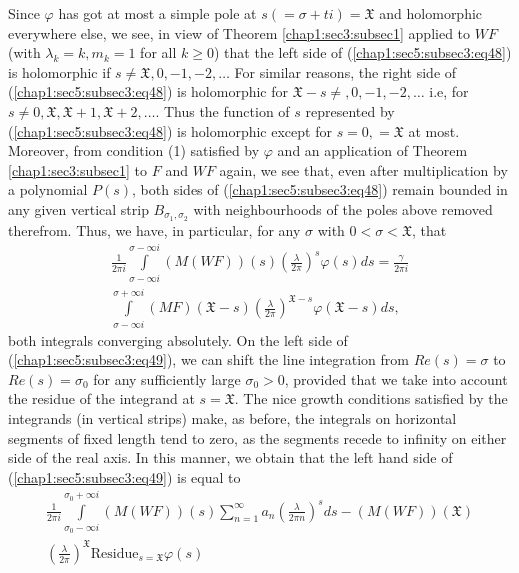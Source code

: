   Since $\varphi$ has got at most a simple pole at
  $s(=\sigma+ti)=\mathfrak{X}$ and holomorphic everywhere else, we see,
  in view of Theorem \ref{chap1:sec3:subsec1} applied to $WF$ (with $\lambda_{k}=k,
  m_{k}=1$ for all $k\ge 0$) that the left side of
  (\ref{chap1:sec5:subsec3:eq48}) is holomorphic
if $s\neq \mathfrak{X},0, -1, -2, \ldots$ For similar reasons, the
right side of (\ref{chap1:sec5:subsec3:eq48}) is holomorphic for $\mathfrak{X}-s\neq, 0, -1, -2,
\ldots$ i.e, for $s\neq 0, \mathfrak{X},
\mathfrak{X}+1,\mathfrak{X}+2,\ldots$. Thus the function of $s$
represented by (\ref{chap1:sec5:subsec3:eq48}) is holomorphic except for $s=0,=\mathfrak{X}$ at
most. Moreover, from condition (1) satisfied by $\varphi $ and an
application of Theorem \ref{chap1:sec3:subsec1} to $F$ and $WF$ again, we see that, even
after multiplication by a polynomial $P(s)$, both sides of
(\ref{chap1:sec5:subsec3:eq48}) 
remain bounded in any given vertical strip $B_{\sigma_{1},\sigma_{2}}$
with neighbourhoods of the poles above removed therefrom. Thus, we
have, in particular, for any $\sigma $ with $0<\sigma<\mathfrak{X}$,
that 
\begin{multline*}
  \frac{1}{2\pi i}\int\limits_{\sigma-\infty i}^{\sigma-\infty
    i}(M(WF))(s)\left(\frac{\lambda}{2\pi
  }\right)^{s}\varphi(s)ds=\frac{\gamma}{2 \pi i}\\
  \int\limits_{\sigma-\infty i}^{\sigma+\infty i}(MF)
  (\mathfrak{X}-s)\left(\frac{\lambda}{2\pi}\right)^{\mathfrak{X}-s}
  \varphi(\mathfrak{X}-s)ds,\tag{49}\label{chap1:sec5:subsec3:eq49}
\end{multline*}
 both integrals converging absolutely. On the left side of
 (\ref{chap1:sec5:subsec3:eq49}), we 
 can shift the line integration from $Re(s)=\sigma$ to
 $Re(s)=\sigma_{0}$ for any sufficiently large $\sigma_{0}>0$,
 provided that we take into account the residue of the integrand at
 $s=\mathfrak{X}$. The nice growth conditions satisfied by the
 integrands (in vertical strips) make, as before, the integrals on
 horizontal segments of fixed length tend to zero, as the segments
 recede to infinity on either side of the real axis. In this manner,
 we obtain that the left hand side of (\ref{chap1:sec5:subsec3:eq49})
 is equal to 
\begin{multline*}
  \frac{1}{2\pi i}\int\limits_{\sigma_{0}-\infty i}^{\sigma_{0}+\infty
  i}(M(WF))(s)\sum\limits_{n=1}^{\infty}a_{n}\left(\frac{\lambda}{2\pi
    n} \right)^{s}ds-(M(WF))(\mathfrak{X})\\
  \left(\frac{\lambda}{2\pi}
  \right)^{\mathfrak{X}}\text{Residue}_{s=\mathfrak{X}}\varphi(s)
\end{multline*}
